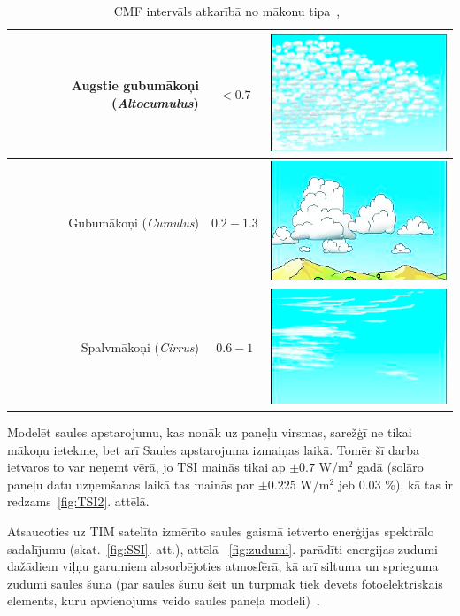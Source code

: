 \begin{table}[h]
	\caption{CMF intervāls atkarībā no mākoņu tipa~\cite{effectCloudsOnSurface},~\cite{cloudAtlas}}
	\begin{center}
		\begin{tabular}{| r | c | c |}
			\hline
			Augstie gubumākoņi (\textit{Altocumulus}) & $<0.7$ & \includegraphics[width=0.1\linewidth]{figures/meteo/cloud_Altocumulus.jpg} \\ \hline
			Gubumākoņi (\textit{Cumulus})        & $0.2-1.3$ & \includegraphics[width=0.1\linewidth]{figures/meteo/cloud_Cumulus.jpg} \\ \hline
			Spalvmākoņi (\textit{Cirrus})        & $0.6-1$  & \includegraphics[width=0.1\linewidth]{figures/meteo/cloud_Cirrus.jpg} \\ \hline
		\end{tabular}
	\end{center}
	\label{tab:CMF}
\end{table}

Modelēt saules apstarojumu, kas nonāk uz paneļu virsmas, sarežģī ne tikai mākoņu ietekme, bet arī Saules apstarojuma izmaiņas laikā. Tomēr šī darba ietvaros to var neņemt vērā, jo TSI mainās tikai ap $\pm 0.7$ W/m$^2$ gadā (solāro paneļu datu uzņemšanas laikā tas mainās par $\pm 0.225$ W/m$^2$ jeb 0.03 \%), kā tas ir redzams~\ref{fig:TSI2}. attēlā.

Atsaucoties uz TIM satelīta izmērīto saules gaismā ietverto enerģijas spektrālo sadalījumu (skat.~\ref{fig:SSI}. att.), attēlā ~\ref{fig:zudumi}. parādīti enerģijas zudumi dažādiem viļņu garumiem absorbējoties atmosfērā, kā arī siltuma un sprieguma zudumi saules šūnā (par saules šūnu šeit un turpmāk tiek dēvēts fotoelektriskais elements, kuru apvienojums veido saules paneļa modeli)~\cite{Sivaram}. 

